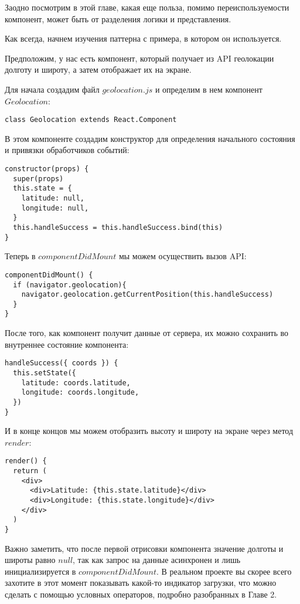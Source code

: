 Заодно посмотрим в этой главе, какая еще польза, помимо переиспользуемости компонент, может быть от разделения логики и представления.

Как всегда, начнем изучения паттерна с примера, в котором он используется.

Предположим, у нас есть компонент, который получает из API геолокации долготу и широту, а затем отображает их на экране.

Для начала создадим файл $geolocation.js$ и определим в нем компонент $Geolocation$:

\begin{lstlisting}
class Geolocation extends React.Component
\end{lstlisting}

В этом компоненте создадим конструктор для определения начального состояния и привязки обработчиков событий:

\begin{lstlisting}
constructor(props) {
  super(props)
  this.state = {
    latitude: null,
    longitude: null,
  }
  this.handleSuccess = this.handleSuccess.bind(this)
}
\end{lstlisting}

Теперь в $componentDidMount$ мы можем осуществить вызов API:

\begin{lstlisting}
componentDidMount() {
  if (navigator.geolocation){     
    navigator.geolocation.getCurrentPosition(this.handleSuccess)
  }
}
\end{lstlisting}

После того, как компонент получит данные от сервера, их можно сохранить во внутреннее состояние компонента:

\begin{lstlisting}
handleSuccess({ coords }) {
  this.setState({
    latitude: coords.latitude,
    longitude: coords.longitude,
  })
}
\end{lstlisting}

И в конце концов мы можем отобразить высоту и широту на экране через метод $render$:

\begin{lstlisting}
render() {
  return (
    <div>
      <div>Latitude: {this.state.latitude}</div>
      <div>Longitude: {this.state.longitude}</div>
    </div> 
  )
}
\end{lstlisting}

Важно заметить, что после первой отрисовки компонента значение долготы и широты равно $null$, так как запрос на данные асинхронен и лишь инициализируется в $componentDidMount$. В реальном проекте вы скорее всего захотите в этот момент показывать какой-то индикатор загрузки, что можно сделать с помощью условных операторов, подробно разобранных в Главе 2.

